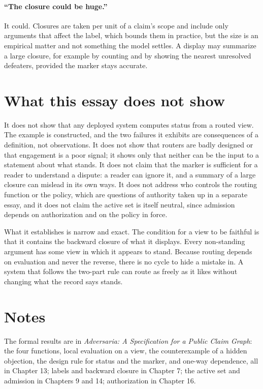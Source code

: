 \documentclass[11pt]{article}
\begin{document}
\paragraph{``The closure could be huge.''} It could. Closures are taken per unit of a claim's scope and include only arguments that affect the label, which bounds them in practice, but the size is an empirical matter and not something the model settles. A display may summarize a large closure, for example by counting and by showing the nearest unresolved defeaters, provided the marker stays accurate.

\section{What this essay does not show}\label{sec:limits}

It does not show that any deployed system computes status from a routed view. The example is constructed, and the two failures it exhibits are consequences of a definition, not observations. It does not show that routers are badly designed or that engagement is a poor signal; it shows only that neither can be the input to a statement about what stands. It does not claim that the marker is sufficient for a reader to understand a dispute: a reader can ignore it, and a summary of a large closure can mislead in its own ways. It does not address who controls the routing function or the policy, which are questions of authority taken up in a separate essay, and it does not claim the active set is itself neutral, since admission depends on authorization and on the policy in force.

What it establishes is narrow and exact. The condition for a view to be faithful is that it contains the backward closure of what it displays. Every non-standing argument has some view in which it appears to stand. Because routing depends on evaluation and never the reverse, there is no cycle to hide a mistake in. A system that follows the two-part rule can route as freely as it likes without changing what the record says stands.

\section*{Notes}

The formal results are in \emph{Adversaria: A Specification for a Public Claim Graph}: the four functions, local evaluation on a view, the counterexample of a hidden objection, the design rule for status and the marker, and one-way dependence, all in Chapter 13; labels and backward closure in Chapter 7; the active set and admission in Chapters 9 and 14; authorization in Chapter 16.
\end{document}
